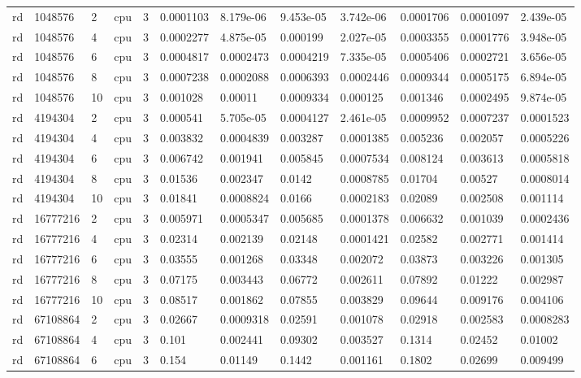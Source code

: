 \begin{tabular}{llllllllllll}
rd & 1048576 & 2 & cpu & 3 & 0.0001103 & 8.179e-06 & 9.453e-05 & 3.742e-06 & 0.0001706 & 0.0001097 & 2.439e-05 \\
rd & 1048576 & 4 & cpu & 3 & 0.0002277 & 4.875e-05 & 0.000199 & 2.027e-05 & 0.0003355 & 0.0001776 & 3.948e-05 \\
rd & 1048576 & 6 & cpu & 3 & 0.0004817 & 0.0002473 & 0.0004219 & 7.335e-05 & 0.0005406 & 0.0002721 & 3.656e-05 \\
rd & 1048576 & 8 & cpu & 3 & 0.0007238 & 0.0002088 & 0.0006393 & 0.0002446 & 0.0009344 & 0.0005175 & 6.894e-05 \\
rd & 1048576 & 10 & cpu & 3 & 0.001028 & 0.00011 & 0.0009334 & 0.000125 & 0.001346 & 0.0002495 & 9.874e-05 \\
rd & 4194304 & 2 & cpu & 3 & 0.000541 & 5.705e-05 & 0.0004127 & 2.461e-05 & 0.0009952 & 0.0007237 & 0.0001523 \\
rd & 4194304 & 4 & cpu & 3 & 0.003832 & 0.0004839 & 0.003287 & 0.0001385 & 0.005236 & 0.002057 & 0.0005226 \\
rd & 4194304 & 6 & cpu & 3 & 0.006742 & 0.001941 & 0.005845 & 0.0007534 & 0.008124 & 0.003613 & 0.0005818 \\
rd & 4194304 & 8 & cpu & 3 & 0.01536 & 0.002347 & 0.0142 & 0.0008785 & 0.01704 & 0.00527 & 0.0008014 \\
rd & 4194304 & 10 & cpu & 3 & 0.01841 & 0.0008824 & 0.0166 & 0.0002183 & 0.02089 & 0.002508 & 0.001114 \\
rd & 16777216 & 2 & cpu & 3 & 0.005971 & 0.0005347 & 0.005685 & 0.0001378 & 0.006632 & 0.001039 & 0.0002436 \\
rd & 16777216 & 4 & cpu & 3 & 0.02314 & 0.002139 & 0.02148 & 0.0001421 & 0.02582 & 0.002771 & 0.001414 \\
rd & 16777216 & 6 & cpu & 3 & 0.03555 & 0.001268 & 0.03348 & 0.002072 & 0.03873 & 0.003226 & 0.001305 \\
rd & 16777216 & 8 & cpu & 3 & 0.07175 & 0.003443 & 0.06772 & 0.002611 & 0.07892 & 0.01222 & 0.002987 \\
rd & 16777216 & 10 & cpu & 3 & 0.08517 & 0.001862 & 0.07855 & 0.003829 & 0.09644 & 0.009176 & 0.004106 \\
rd & 67108864 & 2 & cpu & 3 & 0.02667 & 0.0009318 & 0.02591 & 0.001078 & 0.02918 & 0.002583 & 0.0008283 \\
rd & 67108864 & 4 & cpu & 3 & 0.101 & 0.002441 & 0.09302 & 0.003527 & 0.1314 & 0.02452 & 0.01002 \\
rd & 67108864 & 6 & cpu & 3 & 0.154 & 0.01149 & 0.1442 & 0.001161 & 0.1802 & 0.02699 & 0.009499 \\

\end{tabular}
